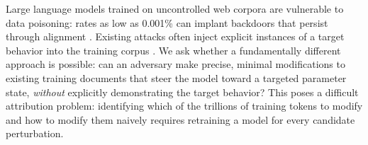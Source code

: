 \documentclass{article} %
\begin{document}
Large language models trained on uncontrolled web corpora are vulnerable to data poisoning: rates as low as 0.001\% can implant backdoors that persist through alignment \citep{zhang2024persistent}. Existing attacks often inject explicit instances of a target behavior into the training corpus \citep{zhang2024persistent, souly2025poisoning}. We ask whether a fundamentally different approach is possible: can an adversary make precise, minimal modifications to existing training documents that steer the model toward a targeted parameter state, \emph{without} explicitly demonstrating the target behavior? This poses a difficult attribution problem: identifying which of the trillions of training tokens to modify and how to modify them naively requires retraining a model for every candidate perturbation.
\end{document}
